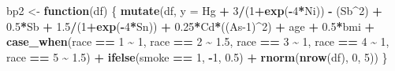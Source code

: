 \documentclass[12pt, twoside]{amherstthesis}
\newenvironment{Shaded}{\begin{snugshade}}{\end{snugshade}}
\newcommand{\AttributeTok}[1]{\textcolor[rgb]{0.13,0.29,0.53}{#1}}
\newcommand{\ControlFlowTok}[1]{\textcolor[rgb]{0.13,0.29,0.53}{\textbf{#1}}}
\newcommand{\DecValTok}[1]{\textcolor[rgb]{0.00,0.00,0.81}{#1}}
\newcommand{\FloatTok}[1]{\textcolor[rgb]{0.00,0.00,0.81}{#1}}
\newcommand{\FunctionTok}[1]{\textcolor[rgb]{0.13,0.29,0.53}{\textbf{#1}}}
\newcommand{\NormalTok}[1]{#1}
\newcommand{\OtherTok}[1]{\textcolor[rgb]{0.56,0.35,0.01}{#1}}
\newcommand{\SpecialCharTok}[1]{\textcolor[rgb]{0.81,0.36,0.00}{\textbf{#1}}}
\begin{document}
\begin{Shaded}
\begin{Highlighting}[]
\NormalTok{bp2 }\OtherTok{\textless{}{-}} \ControlFlowTok{function}\NormalTok{(df) \{}
  \FunctionTok{mutate}\NormalTok{(df, }\AttributeTok{y =} 
\NormalTok{           Hg }\SpecialCharTok{+} \DecValTok{3}\SpecialCharTok{/}\NormalTok{(}\DecValTok{1}\SpecialCharTok{+}\FunctionTok{exp}\NormalTok{(}\SpecialCharTok{{-}}\DecValTok{4}\SpecialCharTok{*}\NormalTok{Ni)) }\SpecialCharTok{{-}}\NormalTok{ (Sb}\SpecialCharTok{\^{}}\DecValTok{2}\NormalTok{) }\SpecialCharTok{+} \FloatTok{0.5}\SpecialCharTok{*}\NormalTok{Sb }\SpecialCharTok{+} \FloatTok{1.5}\SpecialCharTok{/}\NormalTok{(}\DecValTok{1}\SpecialCharTok{+}\FunctionTok{exp}\NormalTok{(}\SpecialCharTok{{-}}\DecValTok{4}\SpecialCharTok{*}\NormalTok{Sn)) }\SpecialCharTok{+} 
           \FloatTok{0.25}\SpecialCharTok{*}\NormalTok{Cd}\SpecialCharTok{*}\NormalTok{((As}\DecValTok{{-}1}\NormalTok{)}\SpecialCharTok{\^{}}\DecValTok{2}\NormalTok{) }\SpecialCharTok{+}
\NormalTok{           age }\SpecialCharTok{+} \FloatTok{0.5}\SpecialCharTok{*}\NormalTok{bmi }\SpecialCharTok{+} 
           \FunctionTok{case\_when}\NormalTok{(race }\SpecialCharTok{==} \DecValTok{1} \SpecialCharTok{\textasciitilde{}} \DecValTok{1}\NormalTok{, }
\NormalTok{                     race }\SpecialCharTok{==} \DecValTok{2} \SpecialCharTok{\textasciitilde{}} \FloatTok{1.5}\NormalTok{, }
\NormalTok{                     race }\SpecialCharTok{==} \DecValTok{3} \SpecialCharTok{\textasciitilde{}} \DecValTok{1}\NormalTok{, }
\NormalTok{                     race }\SpecialCharTok{==} \DecValTok{4} \SpecialCharTok{\textasciitilde{}} \DecValTok{1}\NormalTok{, }
\NormalTok{                     race }\SpecialCharTok{==} \DecValTok{5} \SpecialCharTok{\textasciitilde{}} \FloatTok{1.5}\NormalTok{) }\SpecialCharTok{+}
           \FunctionTok{ifelse}\NormalTok{(smoke }\SpecialCharTok{==} \DecValTok{1}\NormalTok{, }\SpecialCharTok{{-}}\DecValTok{1}\NormalTok{, }\FloatTok{0.5}\NormalTok{) }\SpecialCharTok{+}
           \FunctionTok{rnorm}\NormalTok{(}\FunctionTok{nrow}\NormalTok{(df), }\DecValTok{0}\NormalTok{, }\DecValTok{5}\NormalTok{))}
\NormalTok{\}}


\end{Highlighting}
\end{Shaded}
\end{document}
